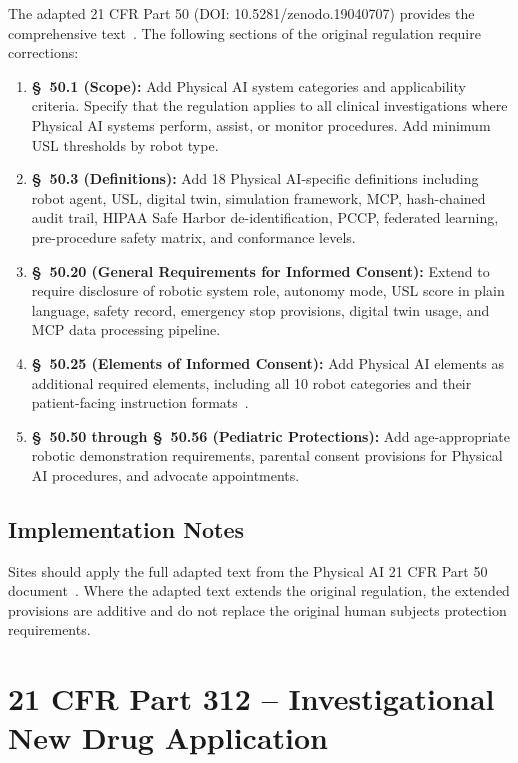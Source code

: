The adapted 21 CFR Part 50 (DOI: 10.5281/zenodo.19040707) provides the
comprehensive text~\cite{cfr50adapt}. The following sections of the original
regulation require corrections:

\begin{enumerate}[label=(\alph*)]
\item \textbf{\S~50.1 (Scope):} Add Physical AI system categories and
  applicability criteria. Specify that the regulation applies to all clinical
  investigations where Physical AI systems perform, assist, or monitor
  procedures. Add minimum USL thresholds by robot type.

\item \textbf{\S~50.3 (Definitions):} Add 18 Physical AI-specific definitions
  including robot agent, USL, digital twin, simulation framework, MCP,
  hash-chained audit trail, HIPAA Safe Harbor de-identification, PCCP,
  federated learning, pre-procedure safety matrix, and conformance levels.

\item \textbf{\S~50.20 (General Requirements for Informed Consent):} Extend
  to require disclosure of robotic system role, autonomy mode, USL score in
  plain language, safety record, emergency stop provisions, digital twin usage,
  and MCP data processing pipeline.

\item \textbf{\S~50.25 (Elements of Informed Consent):} Add Physical AI
  elements as additional required elements, including all 10 robot categories
  and their patient-facing instruction formats~\cite{patientinstructions2026}.

\item \textbf{\S~50.50 through \S~50.56 (Pediatric Protections):} Add
  age-appropriate robotic demonstration requirements, parental consent
  provisions for Physical AI procedures, and advocate appointments.
\end{enumerate}

\subsection{Implementation Notes}

Sites should apply the full adapted text from the Physical AI 21 CFR Part 50
document~\cite{cfr50adapt}. Where the adapted text extends the original
regulation, the extended provisions are additive and do not replace the
original human subjects protection requirements.

\section{21 CFR Part 312 -- Investigational New Drug Application}

